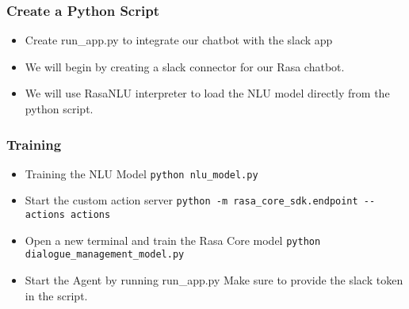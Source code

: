  \begin{frame}[fragile]\frametitle{Create a Python Script}

\begin{itemize}
\item Create run\_app.py to integrate our chatbot with the slack app 
\item We will begin by creating a slack connector for our Rasa chatbot. 
\item We will use RasaNLU interpreter to load the NLU model directly from the python script.
\end{itemize}

\end{frame}

 \begin{frame}[fragile]\frametitle{Training}

\begin{itemize}
\item Training the NLU Model \lstinline|python nlu_model.py|
\item Start the custom action server \lstinline|python -m rasa_core_sdk.endpoint --actions actions|
\item Open a new terminal and train the Rasa Core model \lstinline|python dialogue_management_model.py|
\item Start the Agent by running run\_app.py Make sure to provide the slack token in the script.
\end{itemize}

\end{frame}

